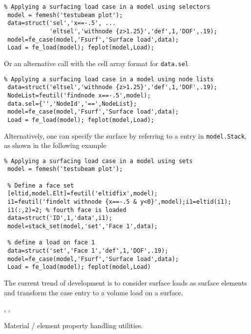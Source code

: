 \begin{verbatim}
% Applying a surfacing load case in a model using selectors
 model = femesh('testubeam plot');
 data=struct('sel','x==-.5', ... 
             'eltsel','withnode {z>1.25}','def',1,'DOF',.19);
 model=fe_case(model,'Fsurf','Surface load',data);
 Load = fe_load(model); feplot(model,Load);
\end{verbatim}%


Or an alternative call with the cell array format for {\tt data.sel}
%
\begin{verbatim}
% Applying a surfacing load case in a model using node lists
 data=struct('eltsel','withnode {z>1.25}','def',1,'DOF',.19);
 NodeList=feutil('findnode x==-.5',model);
 data.sel={'','NodeId','==',NodeList};
 model=fe_case(model,'Fsurf','Surface load',data);
 Load = fe_load(model); feplot(model,Load);
\end{verbatim}%


Alternatively, one can specify the surface by referring to a  entry in {\tt model.Stack}, as shown in the following example


\begin{verbatim}
% Applying a surfacing load case in a model using sets
 model = femesh('testubeam plot');

 % Define a face set
 [eltid,model.Elt]=feutil('eltidfix',model);
 i1=feutil('findelt withnode {x==-.5 & y<0}',model);i1=eltid(i1);
 i1(:,2)=2; % fourth face is loaded
 data=struct('ID',1,'data',i1);
 model=stack_set(model,'set','Face 1',data);

 % define a load on face 1
 data=struct('set','Face 1','def',1,'DOF',.19);
 model=fe_case(model,'Fsurf','Surface load',data);
 Load = fe_load(model); feplot(model,Load)
\end{verbatim}%

The current trend of development is to consider surface loads as surface elements and transform the case entry to a volume load on a surface.


\noindent \fec, \fecase, \femk




\noindent Material / element property handling utilities.


